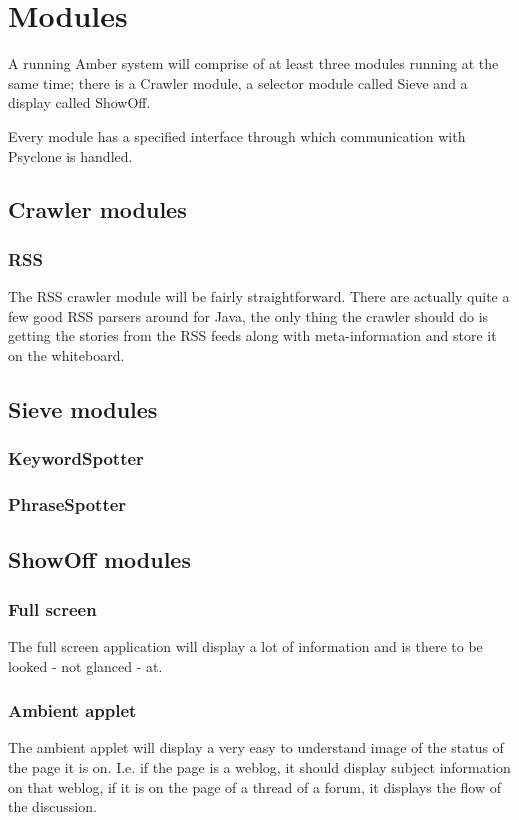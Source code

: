 \section{Modules}

A running Amber system will comprise of at least three modules running at the
same time; there is a Crawler module, a selector module called Sieve and a
display called ShowOff.

Every module has a specified interface through which communication with
Psyclone is handled.

\subsection{Crawler modules}

\subsubsection{RSS}

The RSS crawler module will be fairly straightforward. There are actually quite
a few good RSS parsers around for Java, the only thing the crawler should do is
getting the stories from the RSS feeds along with meta-information and store it
on the whiteboard.

\subsection{Sieve modules}

\subsubsection{KeywordSpotter}

\subsubsection{PhraseSpotter}


\subsection{ShowOff modules}

\subsubsection{Full screen}

The full screen application will display a lot of information and is there to
be looked - not glanced - at.

\subsubsection{Ambient applet}

The ambient applet will display a very easy to understand image of the status
of the page it is on. I.e. if the page is a weblog, it should display subject
information on that weblog, if it is on the page of a thread of a forum, it
displays the flow of the discussion.
